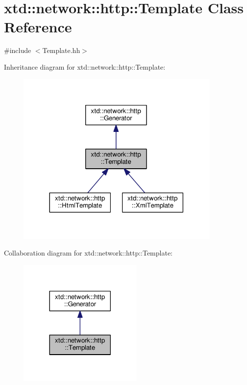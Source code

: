 \hypertarget{classxtd_1_1network_1_1http_1_1Template}{}\section{xtd\+:\+:network\+:\+:http\+:\+:Template Class Reference}
\label{classxtd_1_1network_1_1http_1_1Template}


{\ttfamily \#include $<$Template.\+hh$>$}



Inheritance diagram for xtd\+:\+:network\+:\+:http\+:\+:Template\+:
\nopagebreak
\begin{figure}[H]
\begin{center}
\leavevmode
\includegraphics[width=284pt]{classxtd_1_1network_1_1http_1_1Template__inherit__graph}
\end{center}
\end{figure}


Collaboration diagram for xtd\+:\+:network\+:\+:http\+:\+:Template\+:
\nopagebreak
\begin{figure}[H]
\begin{center}
\leavevmode
\includegraphics[width=173pt]{classxtd_1_1network_1_1http_1_1Template__coll__graph}
\end{center}
\end{figure}
